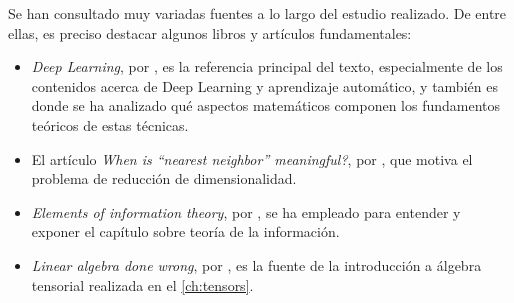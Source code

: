 Se han consultado muy variadas fuentes a lo largo del estudio realizado. De entre ellas, es preciso destacar algunos libros y artículos fundamentales:

\begin{itemize}
\item \emph{Deep Learning}, por \textcite{goodfellow2016}, es la referencia principal del texto, especialmente de los contenidos acerca de Deep Learning y aprendizaje automático, y también es donde se ha analizado qué aspectos matemáticos componen los fundamentos teóricos de estas técnicas.
\item El artículo \emph{When is ``nearest neighbor'' meaningful?}, por \textcite{beyer1999}, que motiva el problema de reducción de dimensionalidad.
\item \emph{Elements of information theory}, por \textcite{coverit}, se ha empleado para entender y exponer el capítulo sobre teoría de la información.
\item \emph{Linear algebra done wrong}, por \textcite{treil2013}, es la fuente de la introducción a álgebra tensorial realizada en el \autoref{ch:tensors}.
\end{itemize}